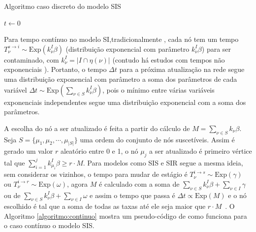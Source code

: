 \begin{algorithm}[htbp]
   \caption{Algoritmo caso discreto do modelo SIS}
   \label{algoritmo:discreto}

   $t \gets 0$\\
\end{algorithm}

Para tempo contínuo no modelo SI,tradicionalmente , cada nó tem um tempo 
$T_{\nu}^{s\rightarrow i} \sim \mathrm{Exp}(k_\nu^I\beta)$ (distribuição exponencial com parâmetro $k_\nu^I\beta$) para ser contaminado,
com $k_\nu^I = |I\cap \eta(\nu)|$ (contudo há estudos com tempos não exponenciais \cite{feng2007epidemiological}). Portanto, o tempo $\Delta t$ para a próxima atualização na rede segue uma distribuição exponencial com parâmetro a soma dos parâmetros de cada variável
$\Delta t \sim \mathrm{Exp}(\sum_{\nu \in S}k_\nu^I\beta)$,
pois o mínimo entre várias variáveis exponenciais independentes segue uma distribuição exponencial com a soma dos parâmetros.

A escolha do nó a ser atualizado é feita a partir do cálculo de 
$M = \sum_{\nu \in S}k_\nu\beta$.
Seja $S = \{\mu_1,\mu_2,\cdots,\mu_{|S|}\}$ uma ordem do conjunto de nós suscetíveis. Assim é gerado um valor $r$ aleatório entre 0 e 1, o nó $\mu_j$ a ser atualizado é primeiro vértice tal que $\sum_{i=1}^{j}k_{\mu_i}^I\beta \geq r\cdot M$. Para modelos como SIS e SIR segue a mesma ideia, sem considerar os vizinhos, o tempo para mudar de estágio é $T_{\nu}^{i\rightarrow s} \sim \mathrm{Exp}(\gamma)$ ou $T_{\nu}^{i\rightarrow r} \sim \mathrm{Exp}(\omega)$, agora $M$ é calculado com a soma de $\sum_{\nu \in S}k_\nu^I\beta+ \sum_{\nu \in I}\gamma$ ou de $\sum_{\nu \in S}k_\nu^I \beta+ \sum_{\nu \in I}\omega$ e assim o tempo que passa é $\Delta t \propto \mathrm{Exp}(M)$ e o nó escolhido é tal que a soma de todas as taxas até ele seja maior que $r\cdot M$~\cite{Gillespie1976}. O Algoritmo \ref{algoritmo:continuo} mostra um pseudo-código de como funciona para o caso contínuo o modelo SIS.


